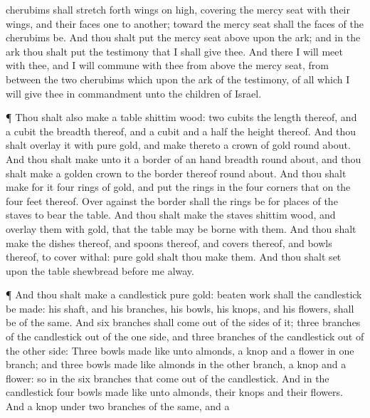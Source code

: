 {cherubims shall
stretch forth
{}
wings on
high,
covering the mercy
seat with their
wings, and their
faces
{}
one to
another; toward the mercy
seat shall the
faces of the
cherubims be.
And thou shalt
put the mercy
seat
above upon the
ark; and in the
ark thou shalt
put the
testimony that I shall
give thee.
And there I will
meet with thee, and I will
commune with thee from above the mercy
seat, from
between the
two
cherubims which
{}
upon the
ark of the
testimony, of all
{} which I will give thee in
commandment unto the
children of
Israel.
\par }{\PP {}¶ Thou shalt also
make a
table
{}
shittim
wood: two
cubits
{} the
length thereof, and a
cubit the
breadth thereof, and a
cubit and a
half the
height thereof.
And thou shalt
overlay it with
pure
gold, and
make thereto a
crown of
gold round
about.
And thou shalt
make unto it a
border of an hand
breadth round
about, and thou shalt
make a
golden
crown to the
border thereof round
about.
And thou shalt
make for it
four
rings of
gold, and
put the
rings in the
four
corners that
{} on the
four
feet thereof.
Over
against the
border shall the
rings be for
places of the
staves to
bear the
table.
And thou shalt
make the
staves
{}
shittim
wood, and
overlay them with
gold, that the
table may be
borne with them.
And thou shalt
make the
dishes thereof, and
spoons thereof, and
covers thereof, and
bowls thereof, to
cover
withal:
{}
pure
gold shalt thou
make them.
And thou shalt
set upon the
table
shewbread
before me
alway.
\par }{\PP {}¶ And thou shalt
make a
candlestick
{}
pure
gold:
{} beaten
work shall the
candlestick be
made: his
shaft, and his
branches, his
bowls, his
knops, and his
flowers, shall be of the same.
And
six
branches shall
come out of the
sides of it;
three
branches of the
candlestick out of the
one
side, and
three
branches of the
candlestick out of the
other
side:
Three
bowls made like unto
almonds,
{} a
knop and a
flower in
one
branch; and
three
bowls made like
almonds in the
other
branch,
{} a
knop and a
flower: so in the
six
branches that
come out of the
candlestick.
And in the
candlestick
{}
four
bowls made like unto
almonds,
{} their
knops and their
flowers.
And
{} a
knop under
two
branches of the same, and a
}
